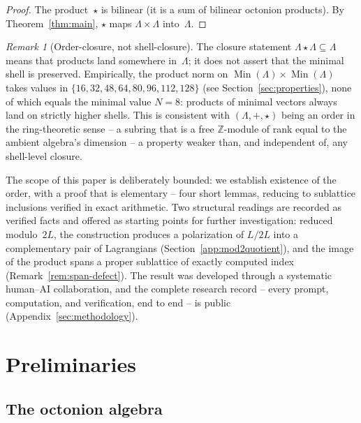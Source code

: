 \documentclass[twoside,english]{paper}
\numberwithin{equation}{section}
\numberwithin{figure}{section}
\theoremstyle{definition}
\theoremstyle{remark}
\newtheorem{remark}[theorem]{Remark}
\newcommand{\ZZ}{\mathbb{Z}}
\newcommand{\LL}{\Lambda}             %
\newcommand{\Nrm}{N}                  %
\begin{document}
\begin{proof}
The product~$\star$ is bilinear (it is a sum of bilinear octonion
products).  By Theorem~\ref{thm:main}, $\star$ maps $\LL \times \LL$
into~$\LL$.
\end{proof}

\begin{remark}[Order-closure, not shell-closure]\label{rem:order-closure}
The closure statement $\LL \star \LL \subseteq \LL$ means that
products land somewhere in~$\LL$; it does not assert that the
minimal shell is preserved.  Empirically, the product norm on
$\operatorname{Min}(\LL) \times \operatorname{Min}(\LL)$ takes values
in $\{16, 32, 48, 64, 80, 96, 112, 128\}$ (see
Section~\ref{sec:properties}), none of which equals the minimal value
$\Nrm = 8$: products of minimal vectors always land on strictly
higher shells.  This is consistent with $(\LL, +, \star)$ being an
order in the ring-theoretic sense -- a subring that is a free
$\ZZ$-module of rank equal to the ambient algebra's dimension --
a property weaker than, and independent of, any shell-level closure.
\end{remark}

The scope of this paper is deliberately bounded: we establish
existence of the order, with a proof that is elementary -- four
short lemmas, reducing to sublattice inclusions verified in exact
arithmetic.  Two
structural readings are recorded as verified facts and offered as
starting points for further investigation: reduced modulo~$2L$, the
construction produces a polarization of $L/2L$ into a complementary
pair of Lagrangians (Section~\ref{app:mod2quotient}), and the image
of the product spans a proper sublattice of exactly computed index
(Remark~\ref{rem:span-defect}).  The result was developed through a
systematic human--AI collaboration, and the complete research record
-- every prompt, computation, and verification, end to end -- is
public~\cite{repo} (Appendix~\ref{sec:methodology}).

\section{Preliminaries}\label{sec:prelim}

\subsection{The octonion algebra}
\end{document}
